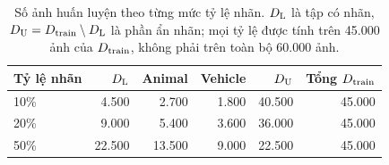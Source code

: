 \begin{table}[htbp]
  \centering
  \small
  \begin{tabular}{@{}l r r r r r@{}}
    \toprule
    Tỷ lệ nhãn & $D_{\mathrm{L}}$ & Animal & Vehicle & $D_{\mathrm{U}}$ & Tổng $D_{\mathrm{train}}$ \\
    \midrule
    10\% & 4.500 & 2.700 & 1.800 & 40.500 & 45.000 \\
    20\% & 9.000 & 5.400 & 3.600 & 36.000 & 45.000 \\
    50\% & 22.500 & 13.500 & 9.000 & 22.500 & 45.000 \\
    \bottomrule
  \end{tabular}
  \caption{Số ảnh huấn luyện theo từng mức tỷ lệ nhãn. $D_{\mathrm{L}}$ là tập có nhãn, $D_{\mathrm{U}} = D_{\mathrm{train}} \setminus D_{\mathrm{L}}$ là phần ẩn nhãn; mọi tỷ lệ được tính trên 45.000 ảnh của $D_{\mathrm{train}}$, không phải trên toàn bộ 60.000 ảnh.}
  \label{tab:label-budget}
\end{table}